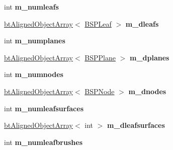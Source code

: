 \begin{DoxyCompactItemize}
\item 
\hypertarget{class_bsp_loader_a1d3a1a8303128a1a9709899c3053ad36}{int {\bfseries m\+\_\+numleafs}}\label{class_bsp_loader_a1d3a1a8303128a1a9709899c3053ad36}

\item 
\hypertarget{class_bsp_loader_a6ff7cc3526fcbc7631699202af7ecadb}{\hyperlink{classbt_aligned_object_array}{bt\+Aligned\+Object\+Array}$<$ \hyperlink{struct_b_s_p_leaf}{B\+S\+P\+Leaf} $>$ {\bfseries m\+\_\+dleafs}}\label{class_bsp_loader_a6ff7cc3526fcbc7631699202af7ecadb}

\item 
\hypertarget{class_bsp_loader_afd66d1d44a3752033346a3d12e388c89}{int {\bfseries m\+\_\+numplanes}}\label{class_bsp_loader_afd66d1d44a3752033346a3d12e388c89}

\item 
\hypertarget{class_bsp_loader_adb9e9ca32dc4eb2c691ab2e79e54b5c3}{\hyperlink{classbt_aligned_object_array}{bt\+Aligned\+Object\+Array}$<$ \hyperlink{struct_b_s_p_plane}{B\+S\+P\+Plane} $>$ {\bfseries m\+\_\+dplanes}}\label{class_bsp_loader_adb9e9ca32dc4eb2c691ab2e79e54b5c3}

\item 
\hypertarget{class_bsp_loader_aa9aa09bf8d4e7f963cc72410384f433c}{int {\bfseries m\+\_\+numnodes}}\label{class_bsp_loader_aa9aa09bf8d4e7f963cc72410384f433c}

\item 
\hypertarget{class_bsp_loader_a510a9fc1cac139949f688775579cc4c9}{\hyperlink{classbt_aligned_object_array}{bt\+Aligned\+Object\+Array}$<$ \hyperlink{struct_b_s_p_node}{B\+S\+P\+Node} $>$ {\bfseries m\+\_\+dnodes}}\label{class_bsp_loader_a510a9fc1cac139949f688775579cc4c9}

\item 
\hypertarget{class_bsp_loader_a1d6c1c6e9c6735be2ffea144134dc3da}{int {\bfseries m\+\_\+numleafsurfaces}}\label{class_bsp_loader_a1d6c1c6e9c6735be2ffea144134dc3da}

\item 
\hypertarget{class_bsp_loader_a147563f8dd940c4763e712b10939afb2}{\hyperlink{classbt_aligned_object_array}{bt\+Aligned\+Object\+Array}$<$ int $>$ {\bfseries m\+\_\+dleafsurfaces}}\label{class_bsp_loader_a147563f8dd940c4763e712b10939afb2}

\item 
\hypertarget{class_bsp_loader_a3159cc25c63f693208f8d7506a333a5a}{int {\bfseries m\+\_\+numleafbrushes}}\label{class_bsp_loader_a3159cc25c63f693208f8d7506a333a5a}


\end{DoxyCompactItemize}
